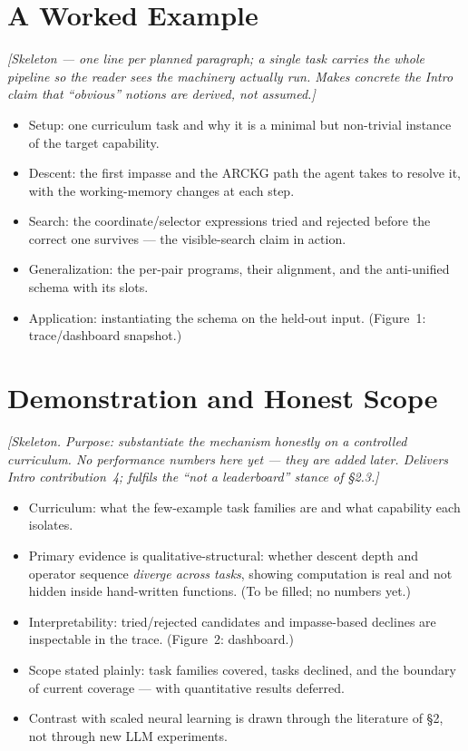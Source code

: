 \documentclass[letterpaper]{article} %
\begin{document}
\section{A Worked Example}
\emph{[Skeleton --- one line per planned paragraph; a single task carries the
whole pipeline so the reader sees the machinery actually run. Makes concrete the
Intro claim that ``obvious'' notions are derived, not assumed.]}
\begin{itemize}
\item Setup: one curriculum task and why it is a minimal but non-trivial instance
of the target capability.
\item Descent: the first impasse and the ARCKG path the agent takes to resolve
it, with the working-memory changes at each step.
\item Search: the coordinate/selector expressions tried and rejected before the
correct one survives --- the visible-search claim in action.
\item Generalization: the per-pair programs, their alignment, and the
anti-unified schema with its slots.
\item Application: instantiating the schema on the held-out input. (Figure~1:
trace/dashboard snapshot.)
\end{itemize}

\section{Demonstration and Honest Scope}
\emph{[Skeleton. Purpose: substantiate the mechanism honestly on a controlled
curriculum. No performance numbers here yet --- they are added later. Delivers
Intro contribution~4; fulfils the ``not a leaderboard'' stance of \S2.3.]}
\begin{itemize}
\item Curriculum: what the few-example task families are and what capability each
isolates.
\item Primary evidence is qualitative-structural: whether descent depth and
operator sequence \emph{diverge across tasks}, showing computation is real and
not hidden inside hand-written functions. (To be filled; no numbers yet.)
\item Interpretability: tried/rejected candidates and impasse-based declines are
inspectable in the trace. (Figure~2: dashboard.)
\item Scope stated plainly: task families covered, tasks declined, and the
boundary of current coverage --- with quantitative results deferred.
\item Contrast with scaled neural learning is drawn through the literature of
\S2, not through new LLM experiments.
\end{itemize}
\end{document}
